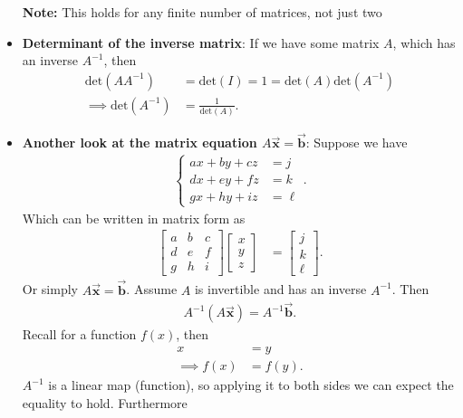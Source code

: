 \documentclass{report}
\begin{document}
\begin{itemize}
        \bigbreak \noindent 
        \textbf{Note:} This holds for any finite number of matrices, not just two
    \item \textbf{Determinant of the inverse matrix}: If we have some matrix $A$, which has an inverse $A^{-1}$, then
        \begin{align*}
            \text{det}(AA^{-1}) &= \text{det}(I) = 1 = \text{det}(A)\text{det}(A^{-1}) \\
            \implies \text{det}(A^{-1}) &= \frac{1}{\text{det}(A)}
        .\end{align*}
    \item \textbf{Another look at the matrix equation $A\vec{\mathbf{x}} = \vec{\mathbf{b}}$}: Suppose we have
        \begin{align*}
            \begin{cases}
                ax + by + cz &= j \\
                dx + ey + fz &= k \\
                gx + hy + iz &= \ell
            \end{cases}
        .\end{align*}
        Which can be written in matrix form as 
        \begin{align*}
            \begin{bmatrix} a & b & c \\ d & e & f \\ g & h & i\end{bmatrix}\begin{bmatrix} x \\ y \\ z\end{bmatrix} &= \begin{bmatrix} j \\ k \\ \ell \end{bmatrix}
        .\end{align*}
        Or simply $A\vec{\mathbf{x}} = \vec{\mathbf{b}}$. Assume $A$ is invertible and has an inverse $A^{-1} $. Then
        \begin{align*}
           A^{-1}(A\vec{\mathbf{x}})  = A^{-1}\vec{\mathbf{b}}
        .\end{align*}
        Recall for a function $f(x)$, then
        \begin{align*}
            x &= y \\
           \implies f(x) &= f(y)
        .\end{align*}
        $A^{-1}$ is a linear map (function), so applying it to both sides we can expect the equality to hold. Furthermore

\end{itemize}
\end{document}
